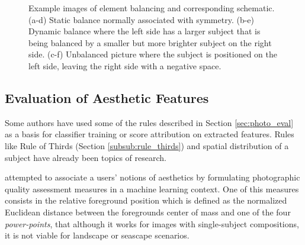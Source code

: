 \begin{figure}[htbp]
        \centering
  \caption{Example images of element balancing and corresponding schematic. (a-d) Static balance normally associated with symmetry. (b-e) Dynamic balance where the left side has a larger subject that is being balanced by a smaller but more brighter subject on the right side. (c-f) Unbalanced picture where the subject is positioned on the left side, leaving the right side with a negative space.}
  \label{fig:balance_elements_image}
\end{figure}

\subsection{Evaluation of Aesthetic Features}
\label{subsub:eval_features}

Some authors have used some of the rules described in Section \ref{sec:photo_eval} as a basis for classifier training or score attribution on extracted features.
Rules like Rule of Thirds (Section \ref{subsub:rule_thirds}) and spatial distribution of a subject have already been topics of research.

\citeauthor{bhattacharya2010framework} \cite{bhattacharya2010framework} attempted to associate a users' notions of aesthetics by formulating photographic quality assessment measures in a machine learning context. One of this measures consists in the relative foreground position which is defined as the normalized Euclidean distance between the foregrounds center of mass and one of the four \emph{power-points}, that although it works for images with single-subject compositions, it is not viable for landscape or seascape scenarios.

